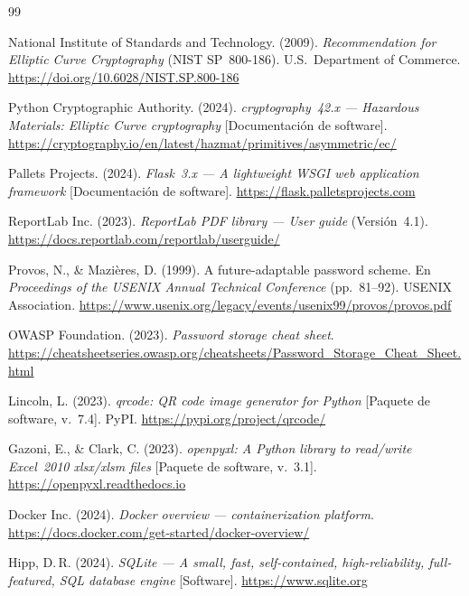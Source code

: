 \documentclass[11pt,letterpaper]{article}
\begin{document}
\begin{thebibliography}{99}

  National Institute of Standards and Technology. (2009).
  \textit{Recommendation for Elliptic Curve Cryptography} (NIST SP~800-186).
  U.S.\ Department of Commerce.
  \url{https://doi.org/10.6028/NIST.SP.800-186}

  Python Cryptographic Authority. (2024).
  \textit{cryptography~42.x --- Hazardous Materials: Elliptic Curve cryptography}
  [Documentaci\'on de software].
  \url{https://cryptography.io/en/latest/hazmat/primitives/asymmetric/ec/}

  Pallets Projects. (2024).
  \textit{Flask~3.x --- A lightweight WSGI web application framework}
  [Documentaci\'on de software].
  \url{https://flask.palletsprojects.com}

  ReportLab Inc. (2023).
  \textit{ReportLab PDF library --- User guide} (Versi\'on~4.1).
  \url{https://docs.reportlab.com/reportlab/userguide/}

  Provos, N., \& Mazi\`eres, D. (1999).
  A future-adaptable password scheme.
  En \textit{Proceedings of the USENIX Annual Technical Conference}
  (pp.~81--92). USENIX Association.
  \url{https://www.usenix.org/legacy/events/usenix99/provos/provos.pdf}

  OWASP Foundation. (2023).
  \textit{Password storage cheat sheet}.
  \url{https://cheatsheetseries.owasp.org/cheatsheets/Password_Storage_Cheat_Sheet.html}

  Lincoln, L. (2023).
  \textit{qrcode: QR code image generator for Python}
  [Paquete de software, v.~7.4]. PyPI.
  \url{https://pypi.org/project/qrcode/}

  Gazoni, E., \& Clark, C. (2023).
  \textit{openpyxl: A Python library to read/write Excel~2010 xlsx/xlsm files}
  [Paquete de software, v.~3.1].
  \url{https://openpyxl.readthedocs.io}

  Docker Inc. (2024).
  \textit{Docker overview --- containerization platform}.
  \url{https://docs.docker.com/get-started/docker-overview/}

  Hipp, D.\,R. (2024).
  \textit{SQLite --- A small, fast, self-contained, high-reliability,
  full-featured, SQL database engine} [Software].
  \url{https://www.sqlite.org}

\end{thebibliography}
\end{document}
